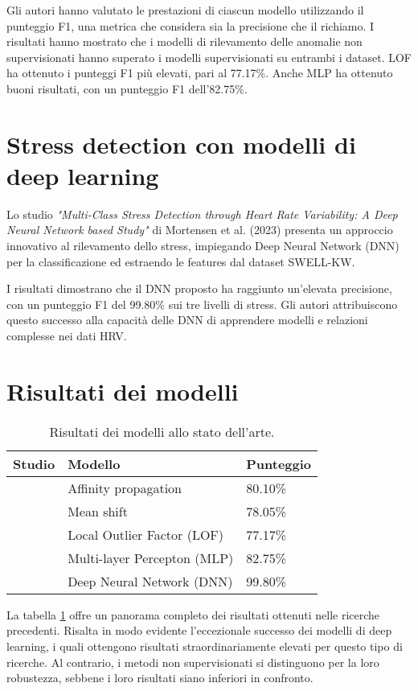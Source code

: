 \bigskip

Gli autori hanno valutato le prestazioni di ciascun modello utilizzando il punteggio F1, una metrica che considera sia la precisione che il richiamo. I risultati hanno mostrato che i modelli di rilevamento delle anomalie non supervisionati hanno superato i modelli supervisionati su entrambi i dataset. LOF ha ottenuto i punteggi F1 più elevati, pari al 77.17\%. Anche MLP ha ottenuto buoni risultati, con un punteggio F1 dell'82.75\%.

\section{Stress detection con modelli di deep learning}

Lo studio \textit{"Multi-Class Stress Detection through Heart Rate Variability: A Deep Neural Network based Study"} di Mortensen et al. (2023) \cite{mortensen2023multi} presenta un approccio innovativo al rilevamento dello stress, impiegando Deep Neural Network (DNN) per la classificazione ed estraendo le features dal dataset SWELL-KW.

\bigskip

I risultati dimostrano che il DNN proposto ha raggiunto un'elevata precisione, con un punteggio F1 del 99.80\% sui tre livelli di stress. Gli autori attribuiscono questo successo alla capacità delle DNN di apprendere modelli e relazioni complesse nei dati HRV.

\section{Risultati dei modelli}

\begin{table}[t]
    \centering
    \begin{tabular}{|lll|}
        \hline
        \textbf{Studio}
        & \textbf{Modello}
        & \textbf{Punteggio} \\
        \hline
        \cite{iqbal2022exploring}
        & Affinity propagation
        & 80.10\% \\
        \cite{iqbal2022exploring}
        & Mean shift
        & 78.05\% \\
        \cite{albaladejo2023evaluating}
        & Local Outlier Factor (LOF)
        & 77.17\% \\
        \cite{albaladejo2023evaluating}
        & Multi-layer Percepton (MLP)
        & 82.75\% \\
        \cite{mortensen2023multi}
        & Deep Neural Network (DNN)
        & 99.80\% \\
        \hline
    \end{tabular}
    \caption{Risultati dei modelli allo stato dell'arte.}
    \label{tab:4-1}
\end{table}

La tabella \ref{tab:4-1} offre un panorama completo dei risultati ottenuti nelle ricerche precedenti. Risalta in modo evidente l'eccezionale successo dei modelli di deep learning, i quali ottengono risultati straordinariamente elevati per questo tipo di ricerche. Al contrario, i metodi non supervisionati si distinguono per la loro robustezza, sebbene i loro risultati siano inferiori in confronto.